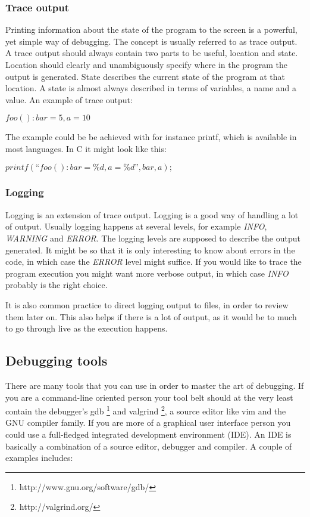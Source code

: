 \documentclass[11pt,a4paper,twoside]{article}
\begin{document}
\subsubsection{Trace output}

Printing information about the state of the program to the screen is a
powerful, yet simple way of debugging. The concept is usually referred to as
trace output. A trace output should always contain two parts to be useful,
location and state. Location should clearly and unambiguously specify where in
the program the output is generated. State describes the current state of the
program at that location. A state is almost always described in terms of
variables, a name and a value. An example of trace output:

$foo(): bar=5, a=10$

The example could be be achieved with for instance printf, which is available
in most languages. In C it might look like this:

$printf(“foo(): bar=\%d, a=\%d”, bar, a);$

\subsubsection{Logging}

Logging is an extension of trace output. Logging is a good way of handling a
lot of output. Usually logging happens at several levels, for example
{\em INFO}, {\em WARNING} and {\em ERROR}. The logging levels are supposed to
describe the output generated. It might be so that it is only interesting to
know about errors in the code, in which case the {\em ERROR} level might suffice. If
you would like to trace the program execution you might want more verbose
output, in which case {\em INFO} probably is the right choice. 

It is also common practice to direct logging output to files, in order to
review them later on. This also helps if there is a lot of output, as it would
be to much to go through live as the execution happens.

\subsection{Debugging tools}

There are many tools that you can use in order to master the art of debugging.
If you are a command-line oriented person your tool belt should at the very
least contain the debugger’s gdb \footnote{http://www.gnu.org/software/gdb/}
and valgrind \footnote{http://valgrind.org/}, a source editor like vim and the
GNU compiler family. If you are more of a graphical user interface person you
could use a full-fledged integrated development environment (IDE). An IDE is
basically a combination of a source editor, debugger and compiler. A couple of
examples includes:
\end{document}
